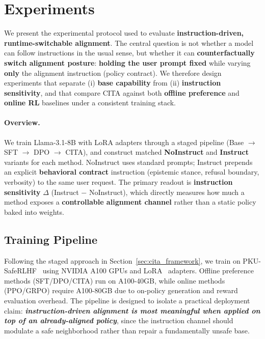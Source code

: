 \section{Experiments}
\label{sec:experiments}

We present the experimental protocol used to evaluate \textbf{instruction-driven, runtime-switchable alignment}.
The central question is not whether a model can follow instructions in the usual sense, but whether it can \textbf{counterfactually switch alignment posture}:
\textbf{holding the user prompt fixed} while varying \textbf{only} the alignment instruction (policy contract).
We therefore design experiments that separate (i) \textbf{base capability} from (ii) \textbf{instruction sensitivity}, and that compare \textsc{CITA} against both \textbf{offline preference} and \textbf{online RL} baselines under a consistent training stack.

\vspace{-0.2em}
\paragraph{\textbf{Overview.}}
We train Llama-3.1-8B with LoRA adapters through a staged pipeline (Base $\rightarrow$ SFT $\rightarrow$ DPO $\rightarrow$ \textsc{CITA}), and construct matched \textbf{NoInstruct} and \textbf{Instruct} variants for each method.
NoInstruct uses standard prompts; Instruct prepends an explicit \textbf{behavioral contract} instruction (epistemic stance, refusal boundary, verbosity) to the same user request.
The primary readout is \textbf{instruction sensitivity} $\Delta$ (Instruct $-$ NoInstruct), which directly measures how much a method exposes a \textbf{controllable alignment channel} rather than a static policy baked into weights.

\vspace{-1mm}
\subsection{Training Pipeline}
\label{sec:training_pipeline_exp}

Following the staged approach in Section~\ref{sec:cita_framework}, we train on PKU-SafeRLHF~\cite{ji2024pku,bai2022training} using NVIDIA A100 GPUs and LoRA~\cite{hu2022lora} adapters.
Offline preference methods (SFT/DPO/\textsc{CITA}) run on A100-40GB, while online methods (PPO/GRPO) require A100-80GB due to on-policy generation and reward evaluation overhead.
The pipeline is designed to isolate a practical deployment claim:
\textbf{\emph{instruction-driven alignment is most meaningful when applied on top of an already-aligned policy}}, since the instruction channel should modulate a safe neighborhood rather than repair a fundamentally unsafe base.

